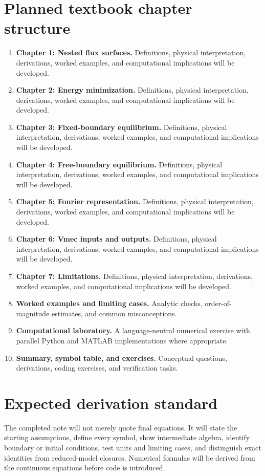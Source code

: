 \documentclass[11pt]{article}
\begin{document}
\section{Planned textbook chapter structure}
\begin{enumerate}[leftmargin=1.8em]
\item \textbf{Chapter 1: Nested flux surfaces.} Definitions, physical interpretation, derivations, worked examples, and computational implications will be developed.
\item \textbf{Chapter 2: Energy minimization.} Definitions, physical interpretation, derivations, worked examples, and computational implications will be developed.
\item \textbf{Chapter 3: Fixed-boundary equilibrium.} Definitions, physical interpretation, derivations, worked examples, and computational implications will be developed.
\item \textbf{Chapter 4: Free-boundary equilibrium.} Definitions, physical interpretation, derivations, worked examples, and computational implications will be developed.
\item \textbf{Chapter 5: Fourier representation.} Definitions, physical interpretation, derivations, worked examples, and computational implications will be developed.
\item \textbf{Chapter 6: Vmec inputs and outputs.} Definitions, physical interpretation, derivations, worked examples, and computational implications will be developed.
\item \textbf{Chapter 7: Limitations.} Definitions, physical interpretation, derivations, worked examples, and computational implications will be developed.
\item \textbf{Worked examples and limiting cases.} Analytic checks, order-of-magnitude estimates, and common misconceptions.
\item \textbf{Computational laboratory.} A language-neutral numerical exercise with parallel Python and MATLAB implementations where appropriate.
\item \textbf{Summary, symbol table, and exercises.} Conceptual questions, derivations, coding exercises, and verification tasks.
\end{enumerate}

\section{Expected derivation standard}
The completed note will not merely quote final equations. It will state the starting assumptions, define every symbol, show intermediate algebra, identify boundary or initial conditions, test units and limiting cases, and distinguish exact identities from reduced-model closures. Numerical formulas will be derived from the continuous equations before code is introduced.
\end{document}
